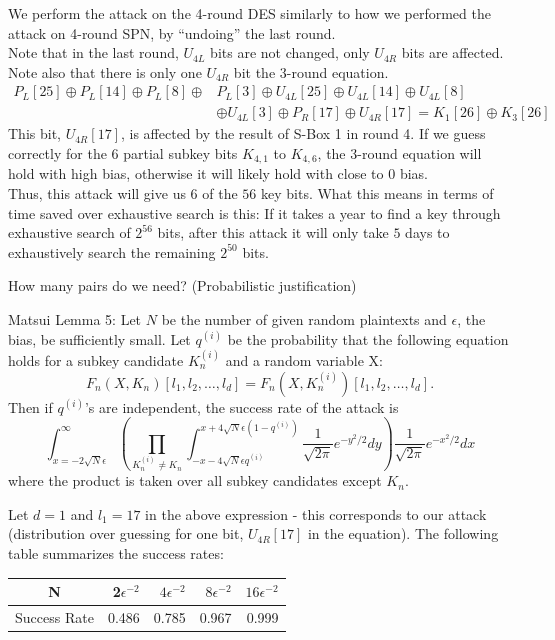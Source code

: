 \documentclass[9pt]{beamer}
\begin{document}
\begin{frame}
We perform the attack on the 4-round DES similarly to how we performed the attack on 4-round SPN, by ``undoing'' the last round.\\
\vspace{5mm}
\pause
Note that in the last round, $U_{4L}$ bits are not changed, only $U_{4R}$ bits are affected. Note also that there is only one $U_{4R}$ bit the 3-round equation.
\begin{align*} 
P_L[25] \oplus P_L[14] \oplus P_L[8] \oplus & P_L[3] \oplus U_{4L}[25] \oplus U_{4L}[14] \oplus U_{4L}[8] \\ & \oplus U_{4L}[3] \oplus P_R[17] \oplus U_{4R}[17] = K_1[26] \oplus K_3[26]
\end{align*}
\vspace{5mm}
\pause
This bit, $U_{4R}[17]$, is affected by the result of S-Box 1 in round 4. If we guess correctly for the 6 partial subkey bits $K_{4,1}$ to $K_{4,6}$, the 3-round equation will hold with high bias, otherwise it will likely hold with close to 0 bias.\\
\vspace{5mm}
\pause
Thus, this attack will give us $6$ of the $56$ key bits. \pause What this means in terms of time saved over exhaustive search is this: If it takes a year to find a key through exhaustive search of $2^{56}$ bits, after this attack it will only take $5$ days to exhaustively search the remaining $2^{50}$ bits.
\end{frame}

\begin{frame}
How many pairs do we need? (Probabilistic justification)

\vspace{3mm}
\pause Matsui Lemma 5: Let $N$ be the number of given random plaintexts and $\epsilon$, the bias, be sufficiently small. Let $q^{(i)}$ be the probability that the following equation holds for a subkey candidate $K_n^{(i)}$ and a random variable X:
\[ F_n(X,K_n)[l_1, l_2,\dots,l_d] = F_n(X, K_n^{(i)})[l_1, l_2, \dots, l_d].\]
\pause Then if $q^{(i)}$'s are independent, the success rate of the attack is
\[ \int_{x=-2\sqrt{N}\epsilon}^\infty \left( \prod_{K_n^{(i)} \neq K_n} \int_{-x-4\sqrt{N}\epsilon q^{(i)}}^{x+4\sqrt{N}\epsilon (1 - q^{(i)})} \frac{1}{\sqrt{2\pi}} e^{-y^2/2} dy \right) \frac{1}{\sqrt{2\pi}} e^{-x^2/2} dx \]
where the product is taken over all subkey candidates except $K_n$.

\vspace{3mm}
\pause Let $d = 1$ and $l_1 = 17$ in the above expression - this corresponds to our attack (distribution over guessing for one bit, $U_{4R}[17]$ in the equation). The following table summarizes the success rates:
\begin{center}
\begin{tabular}{|c|r|r|r|r|}
\hline
N & 2$\epsilon^{-2}$ & $4\epsilon^{-2}$ & $8\epsilon^{-2}$ & $16\epsilon^{-2}$ \\
\hline
Success Rate & 0.486 & 0.785 & 0.967 & 0.999 \\
\hline
\end{tabular} 
\end{center}
\end{frame}
\end{document}
